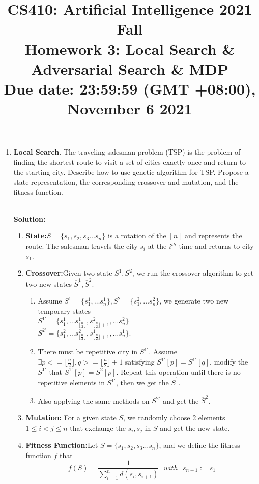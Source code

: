 \documentclass{article}
\title{\normalsize
CS410: Artificial Intelligence 2021 Fall\\
Homework 3: Local Search \& Adversarial Search \& MDP\\
Due date: 23:59:59 (GMT +08:00), November 6 2021}
\author{}
\date{}
\begin{document}
 
\maketitle

\begin{enumerate}
    \item \textbf{Local Search}.
    The traveling salesman problem (TSP) is the problem of finding the shortest route to visit a set of cities exactly once and return to the starting city. 
Describe how to use genetic algorithm for TSP. Propose a state representation, the corresponding crossover and mutation, and the fitness function.\\
~\par
    \textbf{Solution:}
    \begin{enumerate}
        \item \textbf{State:}$S=\{s_1,s_2,s_3\dots s_n\}$ is a rotation of the $[n]$ and represents the route. The salesman travels the city $s_i$ at the $i^{th}$ time and returns to city $s_1$.
        \item \textbf{Crossover:}Given two state $S^{1},S^{2}$, we run the crossover algorithm to get two new states $\overline{S}^{1},\overline{S}^{2}.$
        \begin{enumerate}
            \item Assume $S^{1}=\{s_1^1,\dots s_n^1\},S^{2}=\{s_1^2,\dots s_n^2\}$, we generate two new temporary states\\ $S^{1'}=\{s_1^1,\dots s_{\lfloor \frac{n}{2}\rfloor}^1,s_{\lfloor \frac{n}{2}\rfloor+1}^2,\dots s_n^2\}$ \\$S^{2'}=\{s_1^2,\dots s_{\lfloor \frac{n}{2}\rfloor}^2,s_{\lfloor \frac{n}{2}\rfloor+1}^1,\dots s_n^1\}$.
            \item There must be repetitive city in $S^{1'}$. Assume $\exists p<=\lfloor \frac{n}{2}\rfloor, q>=\lfloor \frac{n}{2}\rfloor+1$ satisfying $S^{1'}[p]=S^{1'}[q]$, modify the $S^{1'}$ that $S^{1'}[p]=S^{2}[p]$. Repeat this operation until there is no repetitive elements in $S^{1'}$, then we get the $\overline{S}^{1}$.
            \item Also applying the same methods on $S^{2'}$ and get the $\overline{S}^{2}$.
        \end{enumerate}
        \item \textbf{Mutation:} For a given state $S$, we randomly choose 2 elements $1\le i<j\le n$ that exchange the $s_i, s_j$ in $S$ and get the new state.
        \item \textbf{Fitness Function:}Let $S=\{s_1,s_2,s_3\dots s_n\}$, and we define the fitness function $f$ that
        \begin{equation}
            f(S)=\frac{1}{\sum_{i=1}^{n}d(s_i,s_{i+1})}~~~with~~~s_{n+1}:=s_1
        \end{equation}
    \end{enumerate}
    

\end{enumerate}
\end{document}
